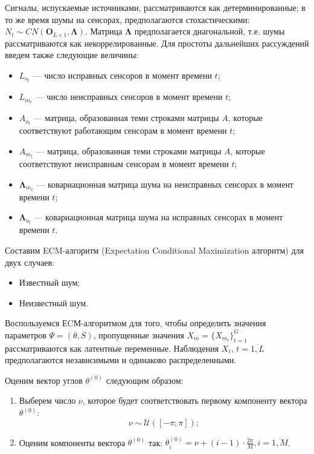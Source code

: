 \documentclass[11pt]{article}
\begin{document}
Сигналы, испускаемые источниками, рассматриваются как детерминированные; в то же время шумы на сенсорах, предполагаются стохастическими: $N_t \sim CN(\mathbf{O}_{L \times 1}, \mathbf{\Lambda})$. Матрица $\mathbf{\Lambda}$ предполагается диагональной, т.е. шумы рассматриваются как некоррелированные. Для простоты дальнейших рассуждений введем также следующие величины:
\begin{itemize}
\item
$L_{o_t}$ --- число исправных сенсоров в момент времени $t$;
\item
 $L_{m_t}$ --- число неисправных сенсоров в момент времени $t$;
\item 
$A_{o_t}$ --- матрица, образованная теми строками матрицы $A$, которые соответствуют работающим сенсорам в момент времени $t$; 
\item
$A_{m_t}$ --- матрица, образованная теми строками матрицы $A$, которые соответствуют неисправным сенсорам в момент времени $t$;
\item
$\mathbf{\Lambda}_{m_t}$ --- ковариационная матрица шума на неисправных сенсорах в момент времени $t$;
\item 
 $\mathbf{\Lambda}_{o_t}$ --- ковариационная матрица шума на исправных сенсорах в момент времени $t$.
\end{itemize}
Составим ECM-алгоритм (Expectation Conditional Maximization алгоритм) для двух случаев:
\begin{itemize}
\item
Известный шум;
\item
Неизвестный шум.
\end{itemize}
\clearpage
\begin{center}
\fontsize{16}{20}\selectfont {}
\end{center}
Воспользуемся ЕCМ-алгоритмом для того, чтобы определить значения параметров $\Psi = (\theta, S)$, пропущенные значения $X_m=\{X_{m_t}\}_{t=1}^G$ рассматриваются как латентные переменные. Наблюдения $X_t$, $t=\overline{1,L}$ предполагаются независимыми и одинаково распределенными.
\begin{center}
\fontsize{14}{18}\selectfont {}
\end{center}
Оценим вектор углов $\theta^{(0)}$ следующим образом:
\begin{enumerate}
\item
Выберем число $\nu$, которое будет соответствовать первому компоненту вектора $\theta^{(0)}$:
$$
\nu \sim \mathcal{U}([-\pi;\pi]);
$$
\item
Оценим компоненты вектора $\theta^{(0)}$ так:  $\theta^{(0)}_i = \nu + (i-1)\cdot \frac{2\pi}{M}, i = \overline{1,M}$.
\end{enumerate}
\end{document}
